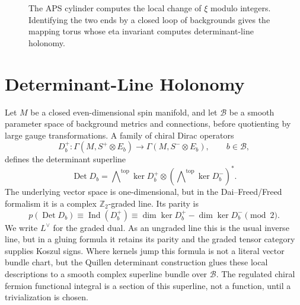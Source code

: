 \begin{figure}[t]
\centering
{}
\caption{The APS cylinder computes the local change of \(\xi\) modulo
integers.  Identifying the two ends by a closed loop of backgrounds gives the
mapping torus whose eta invariant computes determinant-line holonomy.}
\label{fig:eta-cylinder-mapping-torus}
\end{figure}

\section{Determinant-Line Holonomy}

Let \(M\) be a closed even-dimensional spin manifold, and let
\(\mathcal B\) be a smooth parameter space of background metrics and
connections, before quotienting by large gauge transformations.  A family of
chiral Dirac operators
\[
  D_b^+:\Gamma(M,S^+\otimes E_b)\longrightarrow
  \Gamma(M,S^-\otimes E_b),
  \qquad b\in\mathcal B,
\]
defines the determinant superline
\begin{equation}
  \operatorname{Det}D_b
  =
  \bigwedge\nolimits^{\mathrm{top}}\ker D_b^+
  \otimes
  \left(\bigwedge\nolimits^{\mathrm{top}}\ker D_b^-\right)^* .
  \label{eq:det-line-fiber}
\end{equation}
The underlying vector space is one-dimensional, but in the Dai--Freed/Freed
formalism it is a complex \(\mathbb Z_2\)-graded line.  Its parity is
\begin{equation}
  p(\operatorname{Det}D_b)
  \equiv
  \operatorname{Ind}(D_b^+)
  \equiv
  \dim\ker D_b^+ - \dim\ker D_b^-
  \pmod 2 .
  \label{eq:det-superline-parity}
\end{equation}
We write \(L^\vee\) for the graded dual.  As an ungraded line this is the
usual inverse line, but in a gluing formula it retains its parity and the
graded tensor category supplies Koszul signs.
Where kernels jump this formula is not a literal vector bundle chart, but the
Quillen determinant construction glues these local descriptions to a smooth
complex superline bundle over \(\mathcal B\).  The regulated chiral fermion
functional integral is a section of this superline, not a function, until a
trivialization is chosen.

